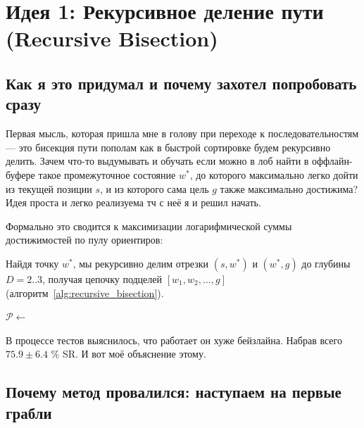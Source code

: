 \section{Идея 1: Рекурсивное деление пути (Recursive Bisection)}

\subsection{Как я это придумал и почему захотел попробовать сразу}

Первая мысль, которая пришла мне в голову при переходе к последовательностям — это бисекция пути пополам как в быстрой сортировке будем рекурсивно делить. Зачем что-то выдумывать и обучать  если можно в лоб найти в оффлайн-буфере такое промежуточное состояние $w^*$, до которого максимально легко дойти из текущей позиции $s$, и из которого сама цель $g$ также максимально достижима?  Идея проста и легко реализуема тч с неё я и решил начать.

Формально это сводится к максимизации логарифмической суммы достижимостей по пулу ориентиров:

Найдя точку $w^*$, мы рекурсивно делим отрезки $(s, w^*)$ и $(w^*, g)$ до глубины $D=2..3$, получая цепочку подцелей $[w_1, w_2, \dots, g]$ (алгоритм~\ref{alg:recursive_bisection}).

\begin{algorithm}[t]
\SetAlgoLined
{}
\BlankLine
{}
$\mathcal{P} \leftarrow$ \;
\caption{Рекурсивная бисекция}
\label{alg:recursive_bisection}
\end{algorithm}

В процессе тестов выяснилось, что работает он хуже бейзлайна.  Набрав всего $75.9 \pm 6.4$ \% SR. И вот моё объяснение этому.

\subsection{Почему метод провалился: наступаем на первые грабли}

